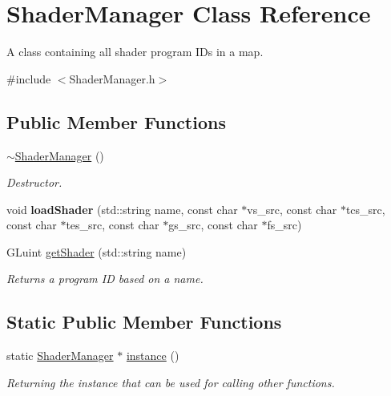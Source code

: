 \hypertarget{class_shader_manager}{\section{Shader\-Manager Class Reference}
\label{class_shader_manager}
}


A class containing all shader program I\-Ds in a map.  




{\ttfamily \#include $<$Shader\-Manager.\-h$>$}

\subsection*{Public Member Functions}
\begin{DoxyCompactItemize}
\item 
\hypertarget{class_shader_manager_a7603399f16432b94223b9fa78f74fb87}{\hyperlink{class_shader_manager_a7603399f16432b94223b9fa78f74fb87}{$\sim$\-Shader\-Manager} ()}\label{class_shader_manager_a7603399f16432b94223b9fa78f74fb87}

\begin{DoxyCompactList}\small\item\em Destructor. \end{DoxyCompactList}\item 
\hypertarget{class_shader_manager_aeb73e8c1993757a54270f19bc23cada9}{void {\bfseries load\-Shader} (std\-::string name, const char $\ast$vs\-\_\-src, const char $\ast$tcs\-\_\-src, const char $\ast$tes\-\_\-src, const char $\ast$gs\-\_\-src, const char $\ast$fs\-\_\-src)}\label{class_shader_manager_aeb73e8c1993757a54270f19bc23cada9}

\item 
G\-Luint \hyperlink{class_shader_manager_ad37a07a4362a3c605ef75ea3d6af081d}{get\-Shader} (std\-::string name)
\begin{DoxyCompactList}\small\item\em Returns a program I\-D based on a name. \end{DoxyCompactList}\end{DoxyCompactItemize}
\subsection*{Static Public Member Functions}
\begin{DoxyCompactItemize}
\item 
static \hyperlink{class_shader_manager}{Shader\-Manager} $\ast$ \hyperlink{class_shader_manager_ad0c27625f06cc78bf8716485f5bce8e2}{instance} ()
\begin{DoxyCompactList}\small\item\em Returning the instance that can be used for calling other functions. \end{DoxyCompactList}\end{DoxyCompactItemize}


